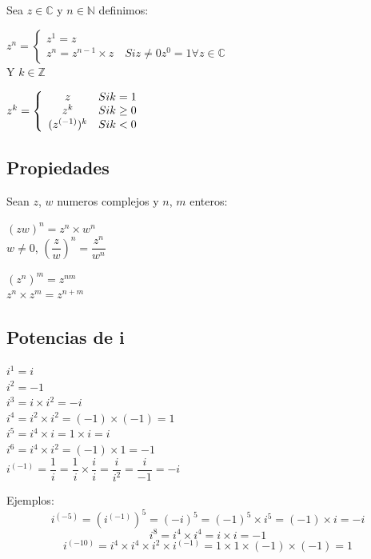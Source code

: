 Sea $z \in \mathbb{C}$ y $n \in \mathbb{N}$ definimos:

$z^n = \left\{ \begin{array}{c}
z^1=z\\
z^n=z^{n-1}\times z \quad Si z\neq 0 z^0=1 \forall z \in \mathbb{C}
\end{array}\right.$\\

Y $k \in \mathbb{Z}$

$z^k = \left\{ \begin{array}{c c}
z & Si k=1\\
z^k & Si k\geq 0\\
(z^{(-1)})^k & Si k<0\\
\end{array}\right.$
 
\subsection{Propiedades}
Sean $z$, $w$ numeros complejos y $n$, $m$ enteros:
\\

\hfill
\begin{minipage}{.45\textwidth}
$(zw)^n=z^n \times w^n$\\
$w\neq0$, $\left(\dfrac{z}{w}\right)^n=\dfrac{z^n}{w^n}$
\end{minipage}
\hfill
\begin{minipage}{.45\textwidth}
$(z^n)^m=z^{nm}$\\
$z^n \times z^m = z^{n+m}$
\end{minipage}
\hfill

\subsection{Potencias de i}
\hfill
\begin{minipage}{.45\textwidth}
$i^1=i$\\
$i^2=-1$\\
$i^3=i\times i^2=-i$\\
$i^4=i^2 \times i^2= (-1) \times (-1)= 1$\\
$i^5=i^4 \times i= 1 \times i= i$\\
$i^6=i^4 \times i^2= (-1) \times 1= -1$\\

$i^{(-1)} = \dfrac{1}{i}=\dfrac{1}{i} \times \dfrac{i}{i}=
\dfrac{i}{i^2}=\dfrac{i}{-1}=-i$\\

\end{minipage}
\hfill
\begin{minipage}{.45\textwidth}
Ejemplos:
$$i^{(-5)}=(i^{(-1)})^5=(-i)^5=(-1)^5 \times i^5= (-1) \times i= -i$$
$$i^8 = i^4 \times i^4 = i \times i = -1$$
$$i^{(-10)} = i^4 \times i^4 \times i^2 \times i^{(-1)}= 1 \times 1 \times (-1) \times (-1)= 1$$
\end{minipage}
\hfill
\\

